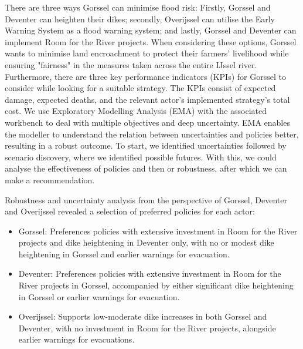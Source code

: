 \begin{multicols}{2}
\noindent There are three ways Gorssel can minimise flood risk: Firstly, Gorssel and Deventer can heighten their dikes; secondly, Overijssel can utilise the Early Warning System as a flood warning system; and lastly, Gorssel and Deventer can implement Room for the River projects. When considering these options, Gorssel wants to minimise land encroachment to protect their farmers' livelihood while ensuring "fairness" in the measures taken across the entire IJssel river. Furthermore, there are three key performance indicators (KPIs) for Gorssel to consider while looking for a suitable strategy. The KPIs consist of expected damage, expected deaths, and the relevant actor's implemented strategy's total cost. We use Exploratory Modelling Analysis (EMA) with the associated workbench to deal with multiple objectives and deep uncertainty. EMA enables the modeller to understand the relation between uncertainties and policies better, resulting in a robust outcome. To start, we identified uncertainties followed by scenario discovery, where we identified possible futures. With this, we could analyse the effectiveness of policies and then or robustness, after which we can make a recommendation. 

\bigskip

Robustness and uncertainty analysis from the perspective of Gorssel, Deventer and Overijssel revealed a selection of preferred policies for each actor:
\begin{itemize}
    \item Gorssel: Preferences policies with extensive investment in Room for the River projects and dike heightening in Deventer only, with no or modest dike heightening in Gorssel and earlier warnings for evacuation.
    \item Deventer: Preferences policies with extensive investment in Room for the River projects in Gorssel, accompanied by either significant dike heightening in Gorssel or earlier warnings for evacuation.
    \item Overijssel: Supports low-moderate dike increases in both Gorssel and Deventer, with no investment in Room for the River projects, alongside earlier warnings for evacuations.
\end{itemize}



\end{multicols}
